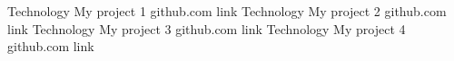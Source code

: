 \begin{entrylist}
    \entry
		{Technology}
		{My project 1}
		{github.com link}
		{%
        \lipsum[1][1-3]}
    \entry
		{Technology}
		{My project 2}
		{github.com link}
		{%
        \lipsum[1][1-3]}
	\entry
		{Technology}
		{My project 3}
		{github.com link}
		{%
        \lipsum[1][1-3]}
    \entry
		{Technology}
		{My project 4}
		{github.com link}
		{%
        \lipsum[1][1-3]}
\end{entrylist}
